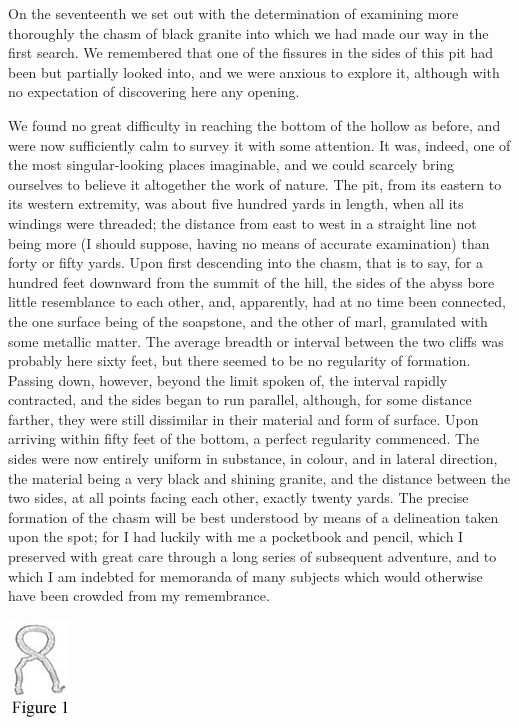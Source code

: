 On the seventeenth we set out with the determination of examining more
thoroughly the chasm of black granite into which we had made our way in the
first search. We remembered that one of the fissures in the sides of this pit
had been but partially looked into, and we were anxious to explore it, although
with no expectation of discovering here any opening. 

We found no great difficulty in reaching the bottom of the hollow as before,
and were now sufficiently calm to survey it with some attention. It was, indeed,
one of the most singular-looking places imaginable, and we could scarcely bring
ourselves to believe it altogether the work of nature. The pit, from its eastern
to its western extremity, was about five hundred yards in length, when all its
windings were threaded; the distance from east to west in a straight line not
being more (I should suppose, having no means of accurate examination) than
forty or fifty yards. Upon first descending into the chasm, that is to say, for
a hundred feet downward from the summit of the hill, the sides of the abyss bore
little resemblance to each other, and, apparently, had at no time been
connected, the one surface being of the soapstone, and the other of marl,
granulated with some metallic matter. The average breadth or interval between
the two cliffs was probably here sixty feet, but there seemed to be no
regularity of formation. Passing down, however, beyond the limit spoken of, the
interval rapidly contracted, and the sides began to run parallel, although, for
some distance farther, they were still dissimilar in their material and form of
surface. Upon arriving within fifty feet of the bottom, a perfect regularity
commenced. The sides were now entirely uniform in substance, in colour, and in
lateral direction, the material being a very black and shining granite, and the
distance between the two sides, at all points facing each other, exactly twenty
yards. The precise formation of the chasm will be best understood by means of a
delineation taken upon the spot; for I had luckily with me a pocketbook and
pencil, which I preserved with great care through a long series of subsequent
adventure, and to which I am indebted for memoranda of many subjects which would
otherwise have been crowded from my remembrance. 
\begin{center}
    \includegraphics[scale=0.75]{Pym_1}
\end{center}

